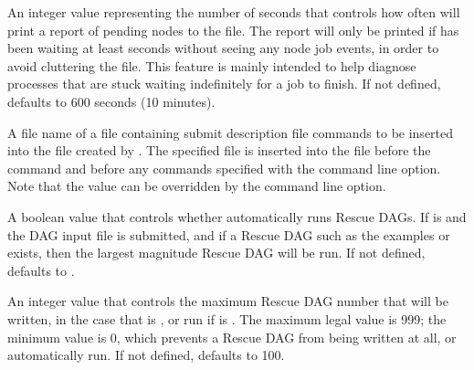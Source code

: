 \begin{description}
\label{param:DAGManPendingReportInterval}
\item[\Macro{DAGMAN\_PENDING\_REPORT\_INTERVAL}]
  An integer value representing the number of seconds that controls
  how often 
  will print a report of pending nodes to the  file.
  The report will only be printed if  has
  been waiting at least 
  seconds without seeing any node job events, in order to
  avoid cluttering the  file.
  This feature is mainly intended to help diagnose  processes 
  that are stuck waiting indefinitely for a job to finish.
  If not defined,
   defaults to 600 seconds
  (10 minutes).

\label{param:DAGManInsertSubFile}
\item[\Macro{DAGMAN\_INSERT\_SUB\_FILE}]
  A file name of a file containing submit description file commands to be
  inserted into the  file created by .
  The specified file is inserted into the  file before
  the  command and before any commands specified with the
    command line option.
  Note that the  value can be overridden
  by the   command line option.

\label{param:DAGManAutoRescue}
\item[\Macro{DAGMAN\_AUTO\_RESCUE}]
  A boolean value that controls whether  automatically
  runs Rescue DAGs.  If  is 
  and the DAG input file  is submitted,
  and if a Rescue DAG such as the examples  or
   exists, 
  then the largest magnitude Rescue DAG will be run.
  If not defined,  defaults to .

\label{param:DAGManMaxRescueNum}
\item[\Macro{DAGMAN\_MAX\_RESCUE\_NUM}]
  An integer value that controls the maximum Rescue DAG
  number that will be written, 
  in the case that  is ,
  or run if  is .
  The maximum legal value is 999; the minimum value is 0,
  which prevents a Rescue DAG from being written at all,
  or automatically run.
  If not defined,  defaults to 100.


\end{description}
